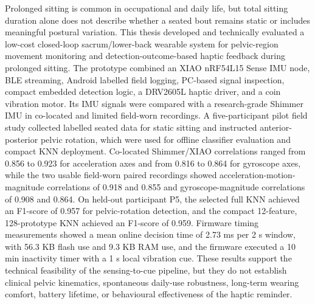 Prolonged sitting is common in occupational and daily life, but total sitting duration alone does not describe whether a seated bout remains static or includes meaningful postural variation. This thesis developed and technically evaluated a low-cost closed-loop sacrum/lower-back wearable system for pelvic-region movement monitoring and detection-outcome-based haptic feedback during prolonged sitting. The prototype combined an XIAO nRF54L15 Sense IMU node, BLE streaming, Android labelled field logging, PC-based signal inspection, compact embedded detection logic, a DRV2605L haptic driver, and a coin vibration motor. Its IMU signals were compared with a research-grade Shimmer IMU in co-located and limited field-worn recordings. A five-participant pilot field study collected labelled seated data for static sitting and instructed anterior-posterior pelvic rotation, which were used for offline classifier evaluation and compact KNN deployment. Co-located Shimmer/XIAO correlations ranged from 0.856 to 0.923 for acceleration axes and from 0.816 to 0.864 for gyroscope axes, while the two usable field-worn paired recordings showed acceleration-motion-magnitude correlations of 0.918 and 0.855 and gyroscope-magnitude correlations of 0.908 and 0.864. On held-out participant P5, the selected full KNN achieved an F1-score of 0.957 for pelvic-rotation detection, and the compact 12-feature, 128-prototype KNN achieved an F1-score of 0.959. Firmware timing measurements showed a mean online decision time of 2.73 ms per 2 s window, with 56.3 KB flash use and 9.3 KB RAM use, and the firmware executed a 10 min inactivity timer with a 1 s local vibration cue. These results support the technical feasibility of the sensing-to-cue pipeline, but they do not establish clinical pelvic kinematics, spontaneous daily-use robustness, long-term wearing comfort, battery lifetime, or behavioural effectiveness of the haptic reminder.
